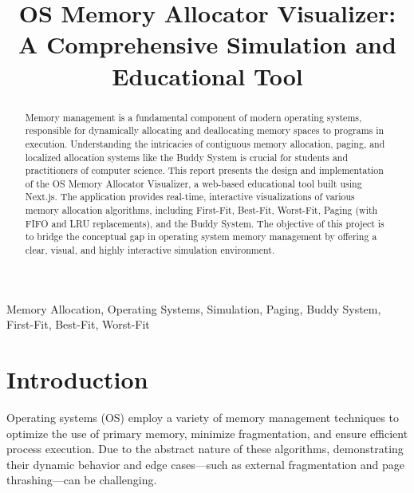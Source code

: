 \documentclass[conference]{IEEEtran}
\begin{document}
\title{OS Memory Allocator Visualizer: A Comprehensive Simulation and Educational Tool}

\author{
\and
{}
\and
{}
\IEEEauthorblockA{\textit{ } \\
}
}

\maketitle

\begin{abstract}
Memory management is a fundamental component of modern operating systems, responsible for dynamically allocating and deallocating memory spaces to programs in execution. Understanding the intricacies of contiguous memory allocation, paging, and localized allocation systems like the Buddy System is crucial for students and practitioners of computer science. This report presents the design and implementation of the OS Memory Allocator Visualizer, a web-based educational tool built using Next.js. The application provides real-time, interactive visualizations of various memory allocation algorithms, including First-Fit, Best-Fit, Worst-Fit, Paging (with FIFO and LRU replacements), and the Buddy System. The objective of this project is to bridge the conceptual gap in operating system memory management by offering a clear, visual, and highly interactive simulation environment.
\end{abstract}

\begin{IEEEkeywords}
Memory Allocation, Operating Systems, Simulation, Paging, Buddy System, First-Fit, Best-Fit, Worst-Fit
\end{IEEEkeywords}

\section{Introduction}
Operating systems (OS) employ a variety of memory management techniques to optimize the use of primary memory, minimize fragmentation, and ensure efficient process execution. Due to the abstract nature of these algorithms, demonstrating their dynamic behavior and edge cases—such as external fragmentation and page thrashing—can be challenging. 
\end{document}
